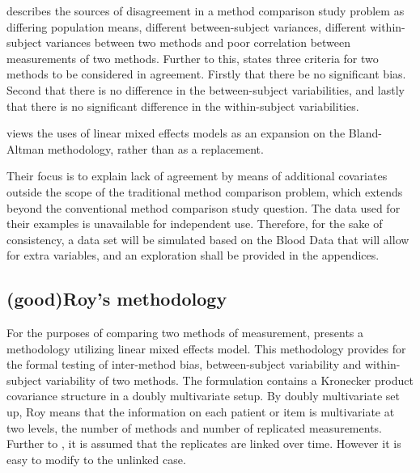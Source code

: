 \documentclass[12pt, a4paper]{report}
\theoremstyle{plain}
\theoremstyle{definition}
\theoremstyle{remark}
\begin{document}
	
	
	
	
	\citet{Barnhart} describes the sources of disagreement in a method comparison study problem as
	differing population means, different between-subject variances, different within-subject variances between two methods and poor
	correlation between measurements of two methods. Further to this, \citet{ARoy2009} states three criteria for two methods to be considered in agreement. Firstly that there be no significant bias. Second that there is no difference in the between-subject variabilities, and lastly that there is no significant difference in the within-subject variabilities. 	
	
	
	
	
	\citet{LaiShiao} views
	the uses of linear mixed effects models as an expansion on the
	Bland-Altman methodology, rather than as a replacement. 
	
	Their focus is to explain lack of agreement by means of additional covariates outside the scope of the traditional method comparison problem, which extends beyond the conventional method comparison study question. The data used for their examples is unavailable for independent use. Therefore, for the sake of consistency, a data set will be simulated based on the Blood Data that will allow for extra variables, and an exploration shall be provided in the appendices.
	

	

		









		\subsection{ (good)Roy's methodology}
		
		For the purposes of comparing two methods of measurement, \citet{ARoy2009} presents a methodology utilizing linear mixed effects model. This methodology provides for the formal testing of inter-method bias, between-subject variability and within-subject variability of two methods. The formulation contains a Kronecker product covariance structure in a doubly multivariate setup. By doubly multivariate set up, Roy means that the information on each patient or item is multivariate at two levels, the number of methods and number of replicated measurements. Further to \citet{lam}, it is assumed that the replicates are linked over time. However it is easy to modify to the unlinked case.
		
\end{document}
